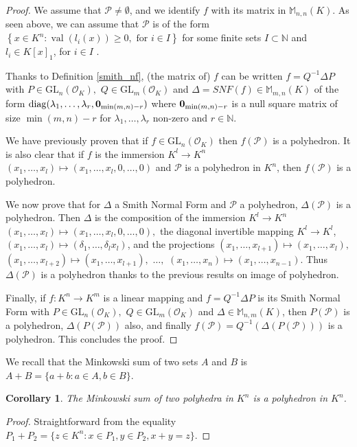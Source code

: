 \documentclass[a4paper,12pt]{article}
\newtheorem{corollary}[theorem]{Corollary}
\newcommand{\N}{\mathbb{N}} %
\newcommand{\allmat}{\mathbb{M}} %
\newcommand{\PP}{\mathcal{P}}
\DeclareMathOperator{\val}{val}
\newcommand{\OK}{\mathcal{O}_K}
\def\diag{\mathrm{diag}}
\newcommand{\GL}{\mathrm{GL}}
\begin{document}
\begin{proof}

We assume that $\PP \neq \emptyset$, and we identify $f$ with its matrix in $\allmat_{n,n}(K)$.
As seen above, we can assume that $\PP$ is of the form $\left\lbrace x \in K^n : \val (l_i (x) ) \geq 0, \textrm{ for } i \in I\right\rbrace$ for some
finite sets $I \subset \N$ and $l_i \in K[x]_1$, for $i \in I$ .


Thanks to Definition \ref{smith_nf}, (the matrix of) $f$
can be written $f=Q^{-1} \Delta P$
with $P \in \GL_n(\OK),$ $Q \in \GL_m(\OK)$
and $\Delta = SNF(f)\in \allmat_{m,n}(K)$ of the form $\diag(\lambda_1, \ldots, \lambda_r, {\bf 0}_{\min(m,n)-r})$
  where ${\bf 0}_{\min(m,n)-r}$ is a null square matrix of size $\min(m,n)-r$ for $\lambda_1,\dots,\lambda_r$ non-zero and $r \in \N.$

We have previously proven that if $f \in \GL_n(\OK)$ then $f(\PP)$ is a polyhedron.
It is also clear that
if $f$ is the immersion 
$K^l \rightarrow K^n$
$(x_1,\dots,x_l)\mapsto (x_1,\dots,x_l,0,\dots,0)$ 
and $\PP$ is a polyhedron in $K^n$,
then $f(\PP)$ is a polyhedron.


We now prove that for
$\Delta$ a Smith Normal Form
and $\PP$ a polyhedron,
$\Delta(\PP)$ is a polyhedron.
Then $\Delta$ is the composition
of the immersion 
$K^l \rightarrow K^n$
$(x_1,\dots,x_l)\mapsto (x_1,\dots,x_l,0,\dots,0),$ 
 the diagonal invertible mapping
$K^l \rightarrow K^l$,
$(x_1,\dots,x_l)\mapsto (\delta_1,\dots,\delta_l x_l)$,
and the projections
$(x_1,\dots,x_{l+1})\mapsto (x_1,\dots,x_{l}),$
 $(x_1,\dots,x_{l+2})\mapsto (x_1,\dots,x_{l+1}),$
 $\dots,$
 $(x_1,\dots,x_{n})\mapsto (x_1,\dots,x_{n-1}).$
 Thus $\Delta(\PP)$ is a polyhedron thanks to the previous 
 results on image of polyhedron.

Finally, if $f: K^n \rightarrow K^m$
is a linear mapping and
$f=Q^{-1} \Delta P$ is its Smith Normal Form
with $P \in \GL_n(\OK),$ $Q \in \GL_m(\OK)$
and $\Delta \in \allmat_{n,m}(K)$,
then
$P(\PP)$ is a polyhedron,
$\Delta (P(\PP))$ also,
and finally $f(\PP)=Q^{-1} (\Delta (P(\PP)))$
is a polyhedron.
This concludes the proof.
\end{proof}

We recall that the Minkowski sum of two sets $A$ and $B$ is $A+B = \{a+b : a \in A, b \in B\}$.

\begin{corollary}
The Minkowski sum of two polyhedra in $K^n$ is a polyhedron in $K^n$.
\end{corollary}
\begin{proof}
  Straightforward from the equality
  $P_1 + P_2 = \{z \in K^n : x \in P_1, y \in P_2, x+y=z\}.$
\end{proof}
\end{document}
